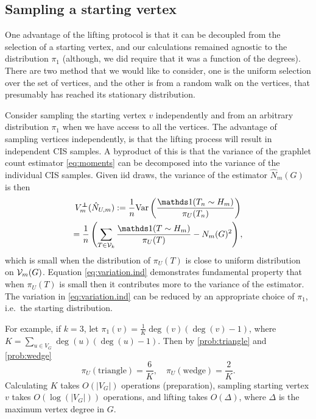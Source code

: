 	\subsection{Sampling a starting vertex}
	
	One advantage of the lifting protocol is that it can be decoupled from the selection of a starting vertex, and our calculations remained agnostic to the distribution $\pi_1$ (although, we did require that it was a function of the degrees).
    There are two method that we would like to consider, one is the uniform selection over the set of vertices, and the other is from a random walk on the vertices, that presumably has reached its stationary distribution. 
	
	Consider sampling the starting vertex $v$ independently and from an arbitrary distribution $\pi_1$ when we have access to all the vertices.
    The advantage of sampling vertices independently, is that the lifting process will result in independent CIS samples.
    A byproduct of this is that the variance of the graphlet count estimator \eqref{eq:moments} can be decomposed into the variance of the individual CIS samples.
    Given iid draws, the variance of the estimator $\hat N_m(G)$ is then  
	\begin{multline}
	\label{eq:variation.ind}
	    V_{m}^{\independent}(\hat N_{U,m}) := \frac 1n \Var\left( \frac{\ind(T_n \sim H_m)}{\pi_U(T_n)} \right)\\
	    =\frac{1}{n}\left(\sum_{T \in \cV_k} \frac{\ind(T\sim H_m)}{\pi_U(T)} - N_m(G)^2\right),
	\end{multline}
	which is small when the distribution of  $\pi_U(T)$ is close to uniform distribution on $\mathcal{V}_m(G)$.
	Equation \eqref{eq:variation.ind} demonstrates fundamental property that when $\pi_U(T)$ is small then it contributes more to the variance of the estimator.
	The variation in \eqref{eq:variation.ind} can be reduced by an appropriate choice of $\pi_1$, i.e.~the starting distribution.
	
	For example, if $k=3$, let $\pi_1(v) = \frac{1}{K}\deg(v)(\deg(v)-1)$, where 
	$K=\sum_{u\in V_G} \deg(u)(\deg(u)-1)$. 
	Then by \eqref{prob:triangle} and \eqref{prob:wedge}
	\begin{equation*}
		\pi_U(\mathrm{triangle}) = \frac{6}{K}, \quad \pi_U(\mathrm{wedge}) = \frac{2}{K}.
	\end{equation*}
	Calculating $K$ takes $O(|V_G|)$ operations (preparation), sampling starting vertex $v$ takes $O(\log(|V_G|))$ operations, and lifting takes $O(\Delta)$, where $\Delta$ is the maximum vertex degree in $G$.


